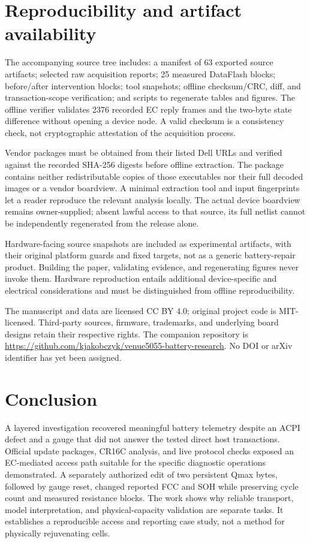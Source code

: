 \documentclass[11pt,a4paper]{article}
\begin{document}
\section{Reproducibility and artifact availability}
The accompanying source tree includes: a manifest of 63 exported source artifacts; selected raw acquisition reports; 25 measured DataFlash blocks; before/after intervention blocks; tool snapshots; offline checksum/CRC, diff, and transaction-scope verification; and scripts to regenerate tables and figures. The offline verifier validates 2376 recorded EC reply frames and the two-byte state difference without opening a device node. A valid checksum is a consistency check, not cryptographic attestation of the acquisition process.

Vendor packages must be obtained from their listed Dell URLs and verified against the recorded SHA-256 digests before offline extraction. The package contains neither redistributable copies of those executables nor their full decoded images or a vendor boardview. A minimal extraction tool and input fingerprints let a reader reproduce the relevant analysis locally. The actual device boardview remains owner-supplied; absent lawful access to that source, its full netlist cannot be independently regenerated from the release alone.

Hardware-facing source snapshots are included as experimental artifacts, with their original platform guards and fixed targets, not as a generic battery-repair product. Building the paper, validating evidence, and regenerating figures never invoke them. Hardware reproduction entails additional device-specific and electrical considerations and must be distinguished from offline reproducibility.

The manuscript and data are licensed CC BY 4.0; original project code is MIT-licensed. Third-party sources, firmware, trademarks, and underlying board designs retain their respective rights. The companion repository is \url{https://github.com/kjakobczyk/venue5055-battery-research}. No DOI or arXiv identifier has yet been assigned.

\section{Conclusion}
A layered investigation recovered meaningful battery telemetry despite an ACPI defect and a gauge that did not answer the tested direct host transactions. Official update packages, CR16C analysis, and live protocol checks exposed an EC-mediated access path suitable for the specific diagnostic operations demonstrated. A separately authorized edit of two persistent Qmax bytes, followed by gauge reset, changed reported FCC and SOH while preserving cycle count and measured resistance blocks. The work shows why reliable transport, model interpretation, and physical-capacity validation are separate tasks. It establishes a reproducible access and reporting case study, not a method for physically rejuvenating cells.
\end{document}
